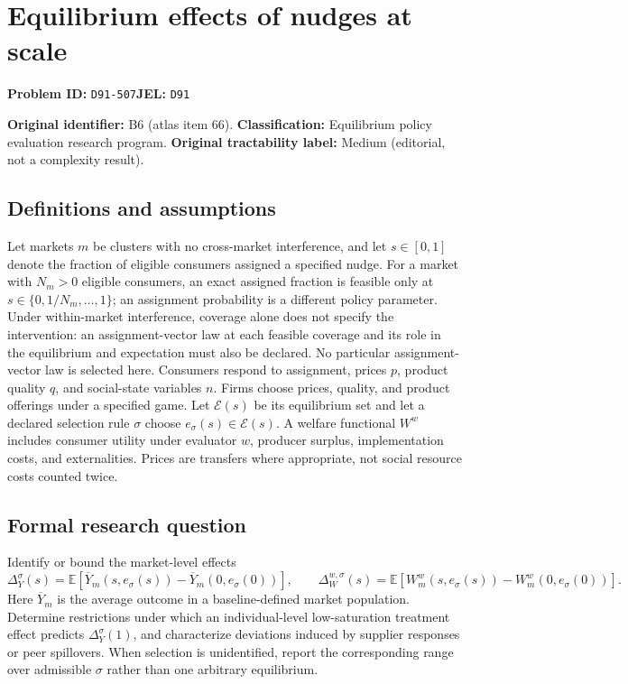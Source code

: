 \documentclass[11pt,a4paper]{article}
\begin{document}
\section*{Equilibrium effects of nudges at scale}
\textbf{Problem ID:} \texttt{D91-507}\quad \textbf{JEL:} \texttt{D91}\par
\label{problem:OP-0066}
\label{atlas:prob:B6}

\noindent\textbf{Original identifier:} B6 (atlas item 66). \textbf{Classification:} Equilibrium policy evaluation research program. \textbf{Original tractability label:} Medium (editorial, not a complexity result).

\subsection*{Definitions and assumptions}

Let markets $m$ be clusters with no cross-market interference, and let $s\in[0,1]$ denote the fraction of eligible consumers assigned a specified nudge. For a market with $N_m>0$ eligible consumers, an exact assigned fraction is feasible only at $s\in\{0,1/N_m,\ldots,1\}$; an assignment probability is a different policy parameter. Under within-market interference, coverage alone does not specify the intervention: an assignment-vector law at each feasible coverage and its role in the equilibrium and expectation must also be declared. No particular assignment-vector law is selected here. Consumers respond to assignment, prices $p$, product quality $q$, and social-state variables $n$. Firms choose prices, quality, and product offerings under a specified game. Let $\mathcal E(s)$ be its equilibrium set and let a declared selection rule $\sigma$ choose $e_\sigma(s)\in\mathcal E(s)$. A welfare functional $W^w$ includes consumer utility under evaluator $w$, producer surplus, implementation costs, and externalities. Prices are transfers where appropriate, not social resource costs counted twice.

\subsection*{Formal research question}

Identify or bound the market-level effects
\[
\Delta_Y^\sigma(s)=\mathbb E[\overline Y_m(s,e_\sigma(s))-\overline Y_m(0,e_\sigma(0))],\qquad
\Delta_W^{w,\sigma}(s)=\mathbb E[W_m^w(s,e_\sigma(s))-W_m^w(0,e_\sigma(0))].
\]
Here $\overline Y_m$ is the average outcome in a baseline-defined market population. Determine restrictions under which an individual-level low-saturation treatment effect predicts $\Delta_Y^\sigma(1)$, and characterize deviations induced by supplier responses or peer spillovers. When selection is unidentified, report the corresponding range over admissible $\sigma$ rather than one arbitrary equilibrium.
\end{document}
